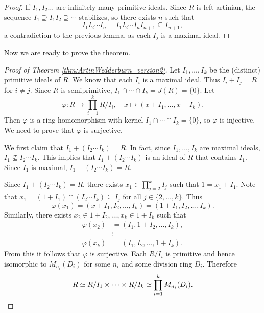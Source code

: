 \begin{proof}
    If $I_1,I_2\dots$ are infinitely many primitive ideals. 
    Since $R$ is left artinian, the sequence 
    $I_1\supseteq I_1I_2\supseteq\cdots$ stabilizes, so there
    exists $n$ such that 
    \[
    I_1I_2\cdots I_n=I_1I_2\cdots I_nI_{n+1}\subseteq I_{n+1},
    \]
    a contradiction to the previous lemma, 
    as each $I_j$ is a maximal ideal. 
\end{proof}

Now we are ready to prove the theorem. 

\begin{proof}[Proof of Theorem \ref{thm:ArtinWedderburn_version2}]
    Let $I_1,\dots,I_k$ be the (distinct) primitive ideals of $R$. 
    We know that each $I_i$ is a maximal ideal. Thus $I_i+I_j=R$ for
    $i\ne j$. Since $R$ is semiprimitive, 
    $I_1\cap\cdots\cap I_k=J(R)=\{0\}$. Let 
    \[
    \varphi\colon R\to \prod_{i=1}^k R/I_i,\quad
    x\mapsto (x+I_1,\dots,x+I_k).
    \]
    Then $\varphi$ is a ring homomorphism with kernel $I_1\cap\cdots\cap I_k=\{0\}$, so
    $\varphi$ is injective. We need to prove that $\varphi$ is surjective. 
    
    We first claim that 
    $I_1+( I_2\cdots I_k) = R$. In fact, 
    since $I_1,\dots,I_k$ are maximal ideals, $I_1\not\subseteq I_2\cdots I_k$. This implies
    that $I_1+(I_2\cdots I_k)$ is an ideal of $R$ that contains $I_1$. Since $I_1$ is maximal, 
    $I_1+(I_2\cdots I_k)=R$. 
    
    Since $I_1+( I_2\cdots I_k) = R$, 
    there exists $x_1\in \prod_{j=2}^kI_j$ such that $1=x_1+I_1$. Note that
    $x_1=(1+I_1)\cap (I_2\cdots I_k)\subseteq I_j$ for all $j\in\{2,\dots,k\}$. 
    Thus 
    \[
    \varphi(x_1)=(x+I_1,I_2,\dots,I_k)=(1+I_1,I_2,\dots, I_k).
    \]
    Similarly,
    there exists $x_2\in 1+I_2,\dots, x_k\in 1+I_k$ such that 
    \begin{align*}
    \varphi(x_2)&=(I_1,1+I_2,\dots,I_k),\\
    &\vdots\\
    \varphi(x_k)&=(I_1,I_2,\dots,1+I_k).
    \end{align*}
    From this it follows that $\varphi$ is surjective. Each $R/I_i$ 
    is primitive and hence isomorphic to $M_{n_i}(D_i)$ for some 
    $n_i$ and some division ring $D_i$. Therefore
    \[
    R\simeq R/I_1\times\cdots\times R/I_k\simeq \prod_{i=1}^kM_{n_i}(D_i).\qedhere 
    \]
\end{proof}

